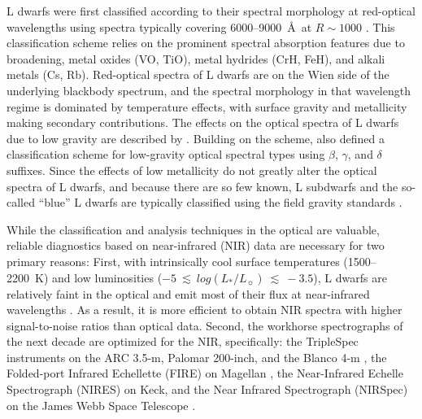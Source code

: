 \documentclass[12pt,preprint]{aastex}
\begin{document}
L dwarfs were first classified according to their spectral morphology at red-optical wavelengths using spectra typically covering 6000--9000~\AA~at $R\sim1000$ \citep{M99,K99,Kirkpatrick05}. 
This classification scheme relies on the prominent spectral absorption features due to  broadening, metal oxides (VO, TiO), metal hydrides (CrH, FeH), and alkali metals (Cs, Rb).
Red-optical spectra of L dwarfs are on the Wien side of the underlying blackbody spectrum, and the spectral morphology in that wavelength regime is dominated by temperature effects, with surface gravity and metallicity making secondary contributions. 
The effects on the optical spectra of L dwarfs due to low gravity are described by \citet{Kirkpatrick06,Kirkpatrick08, Cruz09_lowg}. 
Building on the \citet{K99} scheme, \citet{Cruz09_lowg} also defined a classification scheme for low-gravity optical spectral types using $\beta$, $\gamma$, and $\delta$ suffixes. 
Since the effects of low metallicity do not greatly alter the optical spectra of L dwarfs, and because there are so few known, L subdwarfs and the so-called ``blue'' L dwarfs are typically  classified using the field gravity standards \citep{Burgasser07_subdwarfs, Burgasser08_blue, Kirkpatrick10, Kirkpatrick:2014kv}.

While the classification and analysis techniques in the optical are valuable, reliable diagnostics based on near-infrared (NIR) data are necessary for two primary reasons:
First, with intrinsically cool surface temperatures (1500--2200~K) and low luminosities ($-5~\lesssim~log(L_*/L_\sun)~\lesssim~-3.5$), L dwarfs are relatively faint in the optical and emit most of their flux at near-infrared wavelengths \citep[e.g.,][]{Filippazzo:2015vd}.
As a result, it is more efficient to obtain NIR spectra with higher signal-to-noise ratios than optical data.
Second, the workhorse spectrographs of the next decade are optimized for the NIR, specifically: the TripleSpec instruments on the ARC 3.5-m, Palomar 200-inch, and the Blanco 4-m \citep{Wilson:2004he}, the Folded-port Infrared Echellette (FIRE) on Magellan \citep{Simcoe:2013kh}, the Near-Infrared Echelle Spectrograph (NIRES) on Keck, and the Near Infrared Spectrograph (NIRSpec) on the James Webb Space Telescope \citep{Ferruit:2012em}.
\end{document}

